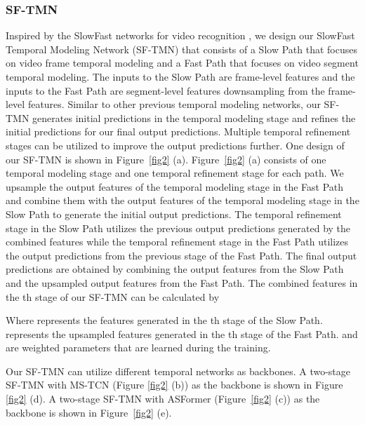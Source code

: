 \documentclass[sn-mathphys,Numbered]{sn-jnl}
\theoremstyle{thmstyleone}\newtheorem{theorem}{Theorem}\newtheorem{proposition}[theorem]{Proposition}
\theoremstyle{thmstyletwo}\newtheorem{example}{Example}\newtheorem{remark}{Remark}
\theoremstyle{thmstylethree}\newtheorem{definition}{Definition}
\begin{document}
\subsubsection{SF-TMN}
Inspired by the SlowFast networks for video recognition \cite{feichtenhofer2019slowfast}, we design our SlowFast Temporal Modeling Network (SF-TMN) that consists of a Slow Path that focuses on video frame temporal modeling and a Fast Path that focuses on video segment temporal modeling. The inputs to the Slow Path are frame-level features and the inputs to the Fast Path are segment-level features downsampling from the frame-level features. Similar to other previous temporal modeling networks, our SF-TMN generates initial predictions in the temporal modeling stage and refines the initial predictions for our final output predictions. Multiple temporal refinement stages can be utilized to improve the output predictions further. One design of our SF-TMN is shown in Figure~\ref{fig2} (a). Figure~\ref{fig2} (a) consists of one temporal modeling stage and one temporal refinement stage for each path. We upsample the output features of the temporal modeling stage in the Fast Path and combine them with the output features of the temporal modeling stage in the Slow Path to generate the initial output predictions. The temporal refinement stage in the Slow Path utilizes the previous output predictions generated by the combined features while the temporal refinement stage in the Fast Path utilizes the output predictions from the previous stage of the Fast Path. The final output predictions are obtained by combining the output features from the Slow Path and the upsampled output features from the Fast Path. The combined features  in the th stage of our SF-TMN can be calculated by

Where  represents the features generated in the th stage of the Slow Path.  represents the upsampled features generated in the th stage of the Fast Path.  and  are weighted parameters that are learned during the training.

Our SF-TMN can utilize different temporal networks as backbones. A two-stage SF-TMN with MS-TCN (Figure \ref{fig2} (b)) as the backbone is shown in Figure \ref{fig2} (d). A two-stage SF-TMN with ASFormer (Figure~\ref{fig2} (c)) as the backbone is shown in Figure~\ref{fig2} (e).
\end{document}

